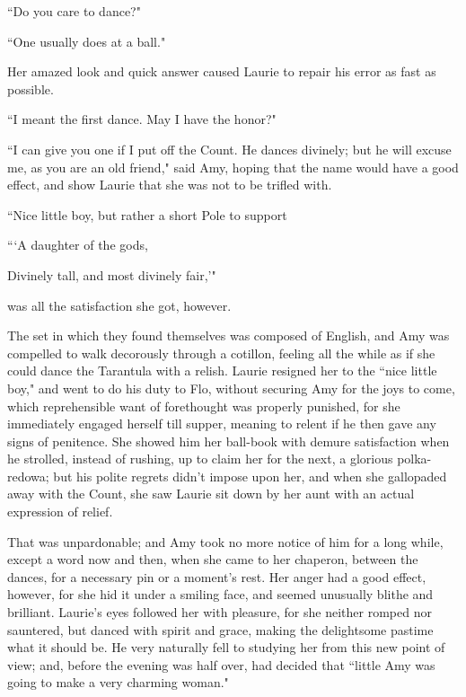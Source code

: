``Do you care to dance?"

``One usually does at a ball."

Her amazed look and quick answer caused Laurie to repair his error as
fast as possible.

``I meant the first dance. May I have the honor?"

``I can give you one if I put off the Count. He dances divinely; but he
will excuse me, as you are an old friend," said Amy, hoping that the
name would have a good effect, and show Laurie that she was not to be
trifled with.

``Nice little boy, but rather a short Pole to support

```A daughter of the gods,

Divinely tall, and most divinely fair,'"

was all the satisfaction she got, however.

The set in which they found themselves was composed of English, and Amy
was compelled to walk decorously through a cotillon, feeling all the
while as if she could dance the Tarantula with a relish. Laurie resigned
her to the ``nice little boy," and went to do his duty to Flo, without
securing Amy for the joys to come, which reprehensible want of
forethought was properly punished, for she immediately engaged herself
till supper, meaning to relent if he then gave any signs of penitence.
She showed him her ball-book with demure satisfaction when he strolled,
instead of rushing, up to claim her for the next, a glorious
polka-redowa; but his polite regrets didn't impose upon
her, and when she gallopaded away with the Count, she saw Laurie sit
down by her aunt with an actual expression of relief.

That was unpardonable; and Amy took no more notice of him for a long
while, except a word now and then, when she came to her chaperon,
between the dances, for a necessary pin or a moment's
rest. Her anger had a good effect, however, for she hid it under a
smiling face, and seemed unusually blithe and brilliant.
Laurie's eyes followed her with pleasure, for she
neither romped nor sauntered, but danced with spirit and grace, making
the delightsome pastime what it should be. He very naturally fell to
studying her from this new point of view; and, before the evening was
half over, had decided that ``little Amy was going to make a very
charming woman."

